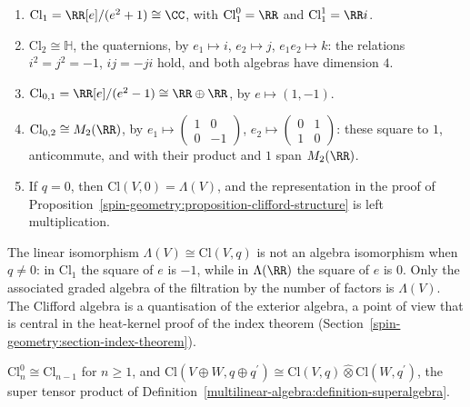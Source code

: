 \begin{example}\label{spin-geometry:example-small-clifford}
\begin{enumerate}
\item $\mathrm{Cl}_1 = \RR[e]/(e^2 + 1) \cong \CC$, with $\mathrm{Cl}_1^0 = \RR$ and $\mathrm{Cl}_1^1 = \RR i$.
\item $\mathrm{Cl}_2 \cong \mathbb{H}$, the quaternions, by $e_1 \mapsto i$, $e_2 \mapsto j$, $e_1e_2 \mapsto k$: the relations $i^2 = j^2 = -1$, $ij = -ji$ hold, and both algebras have dimension $4$.
\item $\mathrm{Cl}_{0,1} = \RR[e]/(e^2 - 1) \cong \RR \oplus \RR$, by $e \mapsto (1, -1)$.
\item $\mathrm{Cl}_{0,2} \cong M_2(\RR)$, by $e_1 \mapsto \begin{pmatrix} 1 & 0 \\ 0 & -1 \end{pmatrix}$, $e_2 \mapsto \begin{pmatrix} 0 & 1 \\ 1 & 0 \end{pmatrix}$: these square to $1$, anticommute, and with their
product and $1$ span $M_2(\RR)$.
\item If $q = 0$, then $\mathrm{Cl}(V, 0) = \Lambda(V)$, and the representation in the proof of Proposition~\ref{spin-geometry:proposition-clifford-structure} is left multiplication.
\end{enumerate}
\end{example}

\begin{counterexample}\label{spin-geometry:counterexample-not-graded-commutative}
The linear isomorphism $\Lambda(V) \cong \mathrm{Cl}(V, q)$ is not an algebra isomorphism when $q \neq 0$: in $\mathrm{Cl}_1$ the square of $e$ is $-1$, while in $\Lambda(\RR)$ the square of $e$ is $0$. Only
the associated graded algebra of the filtration by the number of factors is $\Lambda(V)$. The Clifford algebra is a quantisation of the exterior algebra, a point of view that is central in the heat-kernel
proof of the index theorem (Section~\ref{spin-geometry:section-index-theorem}).
\end{counterexample}

\begin{proposition}\label{spin-geometry:proposition-even-part}
$\mathrm{Cl}_n^0 \cong \mathrm{Cl}_{n-1}$ for $n \geq 1$, and $\mathrm{Cl}(V \oplus W, q \oplus q^{\prime}) \cong \mathrm{Cl}(V, q) \hat\otimes \mathrm{Cl}(W, q^{\prime})$, the super tensor product of
Definition~\ref{multilinear-algebra:definition-superalgebra}.
\end{proposition}

